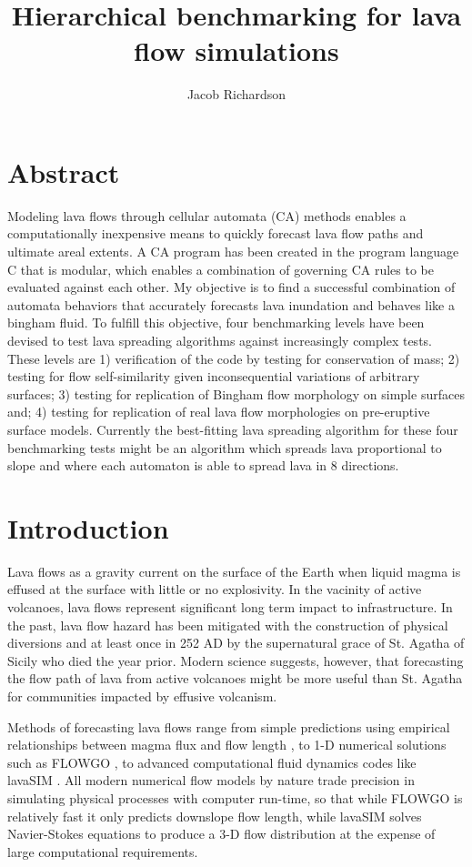 \documentclass[12pt,letter]{article}
\title{Hierarchical benchmarking for lava flow simulations}
\author{Jacob Richardson}
\begin{document}
\maketitle

\section*{Abstract}
	Modeling lava flows through cellular automata (CA) methods enables a computationally inexpensive means to quickly forecast lava flow paths and ultimate areal extents. A CA program has been created in the program language C that is modular, which enables a combination of governing CA rules to be evaluated against each other. My objective is to find a successful combination of automata behaviors that accurately forecasts lava inundation and behaves like a bingham fluid. To fulfill this objective, four benchmarking levels have been devised to test lava spreading algorithms against increasingly complex tests. These levels are 1) verification of the code by testing for conservation of mass; 2) testing for flow self-similarity given inconsequential variations of arbitrary surfaces; 3) testing for replication of Bingham flow morphology on simple surfaces and; 4) testing for replication of real lava flow morphologies on pre-eruptive surface models. Currently the best-fitting lava spreading algorithm for these four benchmarking tests might be an algorithm which spreads lava proportional to slope and where each automaton is able to spread lava in 8 directions.

\section{Introduction}
	Lava flows as a gravity current on the surface of the Earth when liquid magma is effused at the surface with little or no explosivity. In the vacinity of active volcanoes, lava flows represent significant long term impact to infrastructure. In the past, lava flow hazard has been mitigated with the construction of physical diversions and at least once in 252 AD by the supernatural grace of St. Agatha of Sicily who died the year prior. Modern science suggests, however, that forecasting the flow path of lava from active volcanoes might be more useful than St. Agatha for communities impacted by effusive volcanism.

	Methods of forecasting lava flows range from simple predictions using empirical relationships between magma flux and flow length \citep{Glaze2003}, to 1-D numerical solutions such as FLOWGO \citep{harris2001flowgo}, to advanced computational fluid dynamics codes like lavaSIM \citep{hidaka2005vtfs}. All modern numerical flow models by nature trade precision in simulating physical processes with computer run-time, so that while FLOWGO is relatively fast it only predicts downslope flow length, while lavaSIM solves Navier-Stokes equations to produce a 3-D flow distribution at the expense of large computational requirements.
	
\end{document}
